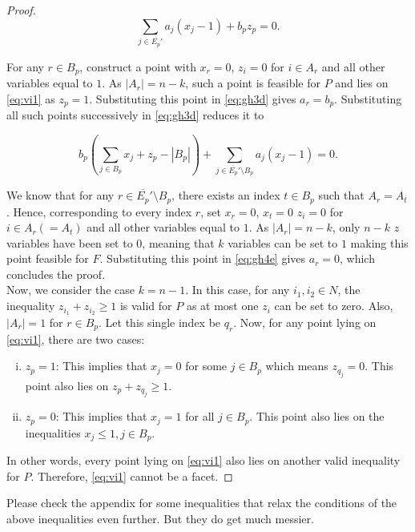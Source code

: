 \documentclass[12pt]{article}
\newcommand{\lp}{\left(}
\newcommand{\rp}{\right)}
\renewcommand{\v}[1]{\overline{#1}}
\newcommand{\sm}{\setminus}
\begin{document}
\begin{proof}
\begin{equation} \label{eq:gh4d}
\sum_{j \in \v{E_p}'} a_j (x_j - 1) + b_p z_p = 0.
\end{equation}

For any $r \in B_p$, construct a point with $x_r = 0$, $z_i = 0$ for $i \in A_r$ and all other variables equal to $1$. As $|A_r| = n-k$, such a point is feasible for $P$ and lies on \eqref{eq:vi1} as $z_p = 1$. Substituting this point in \eqref{eq:gh3d} gives $a_r = b_p$. Substituting all such points successively in \eqref{eq:gh3d} reduces it to

\begin{equation} \label{eq:gh4e}
b_p \lp \sum_{j \in B_p} x_j + z_p - |B_p| \rp + \sum_{j \in \v{E_p}' \sm B_p} a_j (x_j - 1) = 0.
\end{equation}

We know that for any $r \in \v{E_p}' \sm B_p$, there exists an index $t \in B_p$ such that $A_r = A_t$. Hence, corresponding to every index $r$, set $x_r = 0$, $x_t = 0$ $z_i = 0$ for $i \in A_r(=A_t)$ and all other variables equal to $1$. As $|A_r| = n-k$, only $n-k$ $z$ variables have been set to $0$, meaning that $k$ variables can be set to $1$ making this point feasible for $F$. Substituting this point in \eqref{eq:gh4e} gives $a_r = 0$, which concludes the proof.\\

Now, we consider the case $k = n-1$. In this case, for any $i_1,i_2 \in N$, the inequality $z_{i_1} + z_{i_2} \geq 1$ is valid for $P$ as at most one $z_i$ can be set to zero. Also, $|A_r| = 1$ for $r \in B_p$. Let this single index be $q_r$. Now, for any point lying on \eqref{eq:vi1}, there are two cases:

\begin{enumerate}[(i)]
\item $z_p = 1$: This implies that $x_j=0$ for some $j \in B_p$ which means $z_{q_j} = 0$. This point also lies on $z_p + z_{q_j} \geq 1$.
\item $z_p = 0$: This implies that $x_j=1$ for all $j \in B_p$. This point also lies on the inequalities $x_j \leq 1,j \in B_p$.
\end{enumerate}

In other words, every point lying on \eqref{eq:vi1} also lies on another valid inequality for $P$. Therefore, \eqref{eq:vi1} cannot be a facet.
\end{proof}

Please check the appendix for some inequalities that relax the conditions of the above inequalities even further. But they do get much messier.\\
\end{document}

